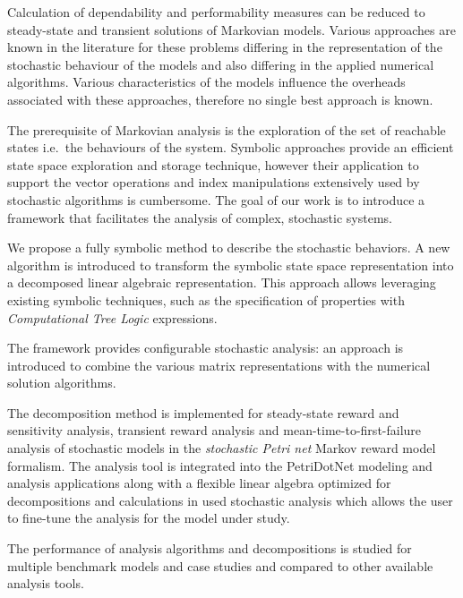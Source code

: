 Calculation of dependability and performability measures can be
reduced to steady-state and transient solutions of Markovian
models. Various approaches are known in the literature for these
problems differing in the representation of the stochastic behaviour
of the models and also differing in the applied numerical
algorithms. Various characteristics of the models influence the
overheads associated with these approaches, therefore no single best
approach is known.

The prerequisite of Markovian analysis is the exploration of the set
of reachable states i.e.~the behaviours of the system. Symbolic
approaches provide an efficient state space exploration and storage
technique, however their application to support the vector operations
and index manipulations extensively used by stochastic algorithms is
cumbersome.  The goal of our work is to introduce a framework that
facilitates the analysis of complex, stochastic systems.

We propose a fully symbolic method to describe the stochastic behaviors. A new algorithm is introduced to transform the symbolic
state space representation into a decomposed linear algebraic
representation. This approach allows leveraging existing symbolic
techniques, such as the specification of
properties with \emph{Computational Tree Logic} 
expressions.

The framework provides configurable stochastic analysis: an approach is introduced to combine the various matrix representations with the numerical solution algorithms. 

The decomposition method is implemented for steady-state reward and
sensitivity analysis, transient reward analysis and
mean-time-to-first-failure analysis of stochastic models in the
\emph{stochastic Petri net}  Markov reward model
formalism. The analysis tool is integrated into the PetriDotNet
modeling and analysis applications along with a flexible linear
algebra optimized for decompositions and calculations in used
stochastic analysis which allows the user to fine-tune the analysis
for the model under study.

The performance of analysis algorithms and decompositions is studied
for multiple benchmark models and case studies and compared to other
available analysis tools.
